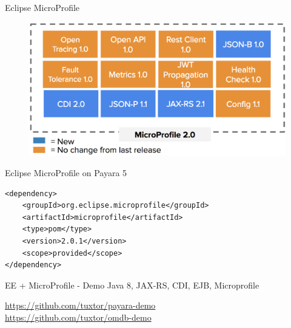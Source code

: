 \documentclass{beamer}
\begin{document}
\begin{frame}{Eclipse MicroProfile}
\begin{figure}
	\centering
	\includegraphics[width=\linewidth]{Images/mp5}
\end{figure}
\end{frame}

\begin{frame}[fragile]{Eclipse MicroProfile on Payara 5}
\begin{lstlisting}
<dependency>
	<groupId>org.eclipse.microprofile</groupId>
	<artifactId>microprofile</artifactId>
	<type>pom</type>
	<version>2.0.1</version>
	<scope>provided</scope>
</dependency>
\end{lstlisting}
\end{frame}




\begin{frame}{EE + MicroProfile  - Demo}
\huge Java 8, JAX-RS, CDI, EJB, Microprofile

\normalsize  \url{https://github.com/tuxtor/payara-demo}\\
\normalsize  \url{https://github.com/tuxtor/omdb-demo}
\end{frame}
\end{document}
